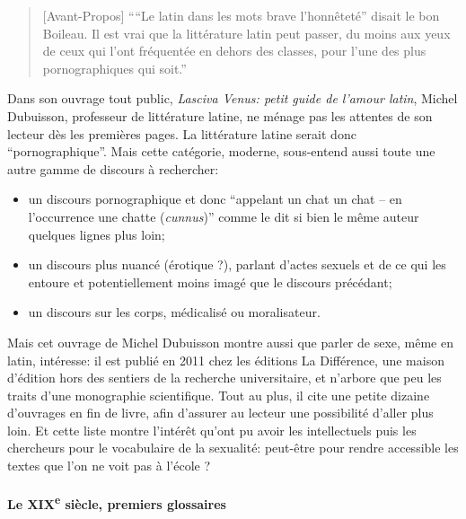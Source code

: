 \begin{quote}[Avant-Propos]{\cite*{dubuisson_lasciva_2011}}
    \enquote{``Le latin dans les mots brave l'honnêteté'' disait le bon Boileau. Il est vrai que la littérature latin peut passer, du moins aux yeux de ceux qui l'ont fréquentée en dehors des classes, pour l'une des plus pornographiques qui soit.}
\end{quote}

Dans son ouvrage tout public, \textit{Lasciva Venus: petit guide de l'amour latin}, Michel Dubuisson, professeur de littérature latine, ne ménage pas les attentes de son lecteur dès les premières pages. La littérature latine serait donc \enquote{pornographique}. Mais cette catégorie, moderne, sous-entend aussi toute une autre gamme de discours à rechercher:
\begin{itemize}
    \item un discours pornographique et donc \enquote{appelant un chat un chat -- en l'occurrence une chatte (\textit{cunnus})} comme le dit si bien le même auteur quelques lignes plus loin;
    \item un discours plus nuancé (érotique ?), parlant d'actes sexuels et de ce qui les entoure et potentiellement moins imagé que le discours précédant;
    \item un discours sur les corps, médicalisé ou moralisateur.
\end{itemize}

Mais cet ouvrage de Michel Dubuisson montre aussi que parler de sexe, même en latin, intéresse: il est publié en 2011 chez les éditions La Différence, une maison d'édition hors des sentiers de la recherche universitaire, et n'arbore que peu les traits d'une monographie scientifique. Tout au plus, il cite une petite dizaine d'ouvrages en fin de livre, afin d'assurer au lecteur une possibilité d'aller plus loin. Et cette liste montre l'intérêt qu'ont pu avoir les intellectuels puis les chercheurs pour le vocabulaire de la sexualité: peut-être pour rendre accessible les textes que l'on ne voit pas à l'école ?

\paragraph{Le XIX\textsuperscript{e} siècle, premiers glossaires}

